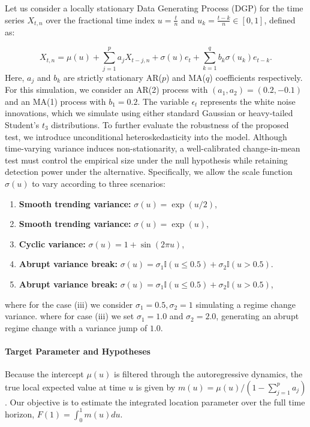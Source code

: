\documentclass[10pt, a4paper]{article}
\theoremstyle{assumption}
\theoremstyle{definition}
\theoremstyle{theorem}
\begin{document}
Let us consider a locally stationary Data Generating Process (DGP) for the time series $X_{t,n}$ over the fractional time index $u = \frac{t}{n}$ and $ u_k = \frac{t-k}{n}\in [0,1]$, defined as: 

\begin{equation}
\label{eq:change_in_mean}
X_{t,n} = \mu(u) + \sum_{j=1}^p a_j X_{t-j,n} + \sigma(u) e_t + \sum_{k=1}^q b_k \sigma(u_k)e_{t-k}.
\end{equation}
Here, $a_j$ and $b_k$ are strictly stationary AR($p$) and MA($q$) coefficients respectively. For this simulation, we consider an AR(2) process with $(a_1, a_2) = (0.2, -0.1)$ and an MA(1) process with $b_1 = 0.2$. The variable $\epsilon_t$ represents the white noise innovations, which we simulate using either standard Gaussian or heavy-tailed Student's $t_3$ distributions. 
To further evaluate the robustness of the proposed test, we introduce unconditional heteroskedasticity into the model. Although time-varying variance induces non-stationarity, a well-calibrated change-in-mean test must control the empirical size under the null hypothesis while retaining detection power under the alternative. Specifically, we allow the scale function $\sigma(u)$ to vary according to three scenarios:
\begin{enumerate}[label=(\roman*)]
\item \textbf{Smooth trending variance:} $\sigma(u) = \exp(u/2)$,
\item \textbf{Smooth trending variance:} $\sigma(u) = \exp(u)$,
\item \textbf{Cyclic variance:} $\sigma(u) = 1 +  \sin(2\pi u)$,
\item \textbf{Abrupt variance break:} $\sigma(u) = \sigma_1 \mathbb{I}(u \le 0.5) + \sigma_2 \mathbb{I}(u > 0.5)$.
\item \textbf{Abrupt variance break:} $\sigma(u) = \sigma_1 \mathbb{I}(u \le 0.5) + \sigma_2 \mathbb{I}(u > 0.5)$,
\end{enumerate}
where for the case (iii) we consider $\sigma_1 = 0.5, \sigma_2 = 1$ simulating a regime change variance.
where for case (iii) we set $\sigma_1 = 1.0$ and $\sigma_2 = 2.0$, generating an abrupt regime change with a variance jump of $1.0$.
\paragraph{Target Parameter and Hypotheses}
Because the intercept $\mu(u)$ is filtered through the autoregressive dynamics, the true local expected value at time $u$ is given by $m(u) = \mu(u) / (1 - \sum_{j=1}^p a_j)$. Our objective is to estimate the integrated location parameter over the full time horizon, $F(1) = \int_0^1 m(u)du$.
\end{document}
